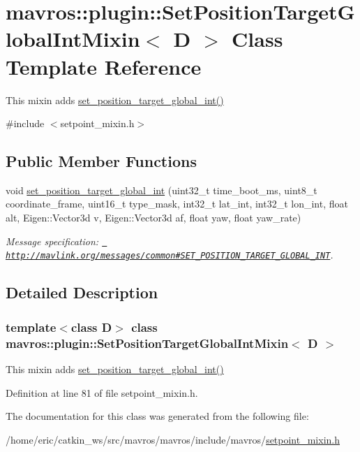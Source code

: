 \hypertarget{classmavros_1_1plugin_1_1SetPositionTargetGlobalIntMixin}{}\section{mavros\+::plugin\+::Set\+Position\+Target\+Global\+Int\+Mixin$<$ D $>$ Class Template Reference}
\label{classmavros_1_1plugin_1_1SetPositionTargetGlobalIntMixin}


This mixin adds \mbox{\hyperlink{group__plugin_ga6e107096694f2c4483c9578a1a93d085}{set\+\_\+position\+\_\+target\+\_\+global\+\_\+int()}}  




{\ttfamily \#include $<$setpoint\+\_\+mixin.\+h$>$}

\subsection*{Public Member Functions}
\begin{DoxyCompactItemize}
\item 
void \mbox{\hyperlink{group__plugin_ga6e107096694f2c4483c9578a1a93d085}{set\+\_\+position\+\_\+target\+\_\+global\+\_\+int}} (uint32\+\_\+t time\+\_\+boot\+\_\+ms, uint8\+\_\+t coordinate\+\_\+frame, uint16\+\_\+t type\+\_\+mask, int32\+\_\+t lat\+\_\+int, int32\+\_\+t lon\+\_\+int, float alt, Eigen\+::\+Vector3d v, Eigen\+::\+Vector3d af, float yaw, float yaw\+\_\+rate)
\begin{DoxyCompactList}\small\item\em Message specification\+: {\ttfamily \href{http://mavlink.org/messages/common\#SET_POSITION_TARGET_GLOBAL_INT}{\texttt{ http\+://mavlink.\+org/messages/common\#\+S\+E\+T\+\_\+\+P\+O\+S\+I\+T\+I\+O\+N\+\_\+\+T\+A\+R\+G\+E\+T\+\_\+\+G\+L\+O\+B\+A\+L\+\_\+\+I\+NT}}}. \end{DoxyCompactList}\end{DoxyCompactItemize}


\subsection{Detailed Description}
\subsubsection*{template$<$class D$>$\newline
class mavros\+::plugin\+::\+Set\+Position\+Target\+Global\+Int\+Mixin$<$ D $>$}

This mixin adds \mbox{\hyperlink{group__plugin_ga6e107096694f2c4483c9578a1a93d085}{set\+\_\+position\+\_\+target\+\_\+global\+\_\+int()}} 

Definition at line 81 of file setpoint\+\_\+mixin.\+h.



The documentation for this class was generated from the following file\+:\begin{DoxyCompactItemize}
\item 
/home/eric/catkin\+\_\+ws/src/mavros/mavros/include/mavros/\mbox{\hyperlink{setpoint__mixin_8h}{setpoint\+\_\+mixin.\+h}}\end{DoxyCompactItemize}
